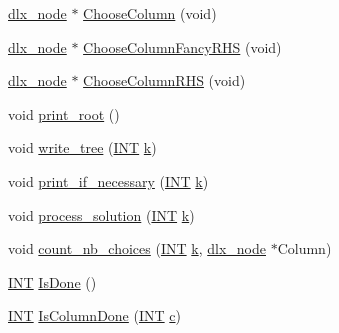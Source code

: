\begin{DoxyCompactItemize}
\item 
\mbox{\hyperlink{structdlx__node}{dlx\+\_\+node}} $\ast$ \mbox{\hyperlink{_l_i_b_2_g_a_l_o_i_s_2dlx_8_c_ab9cb65741895b0cca305fac563917215}{Choose\+Column}} (void)
\item 
\mbox{\hyperlink{structdlx__node}{dlx\+\_\+node}} $\ast$ \mbox{\hyperlink{_l_i_b_2_g_a_l_o_i_s_2dlx_8_c_ae4457eb22022b816e8281ce9c66b177b}{Choose\+Column\+Fancy\+R\+HS}} (void)
\item 
\mbox{\hyperlink{structdlx__node}{dlx\+\_\+node}} $\ast$ \mbox{\hyperlink{_l_i_b_2_g_a_l_o_i_s_2dlx_8_c_af8cfa323dad8209f4cef07a2ef5434a9}{Choose\+Column\+R\+HS}} (void)
\item 
void \mbox{\hyperlink{_l_i_b_2_g_a_l_o_i_s_2dlx_8_c_a2d00a1acd6eba01ef275965881981f59}{print\+\_\+root}} ()
\item 
void \mbox{\hyperlink{_l_i_b_2_g_a_l_o_i_s_2dlx_8_c_ac9de85ee7e49f43b2255f8164510f036}{write\+\_\+tree}} (\mbox{\hyperlink{galois_8h_a09fddde158a3a20bd2dcadb609de11dc}{I\+NT}} \mbox{\hyperlink{simeon_8_c_a43fa990200c3ddd47c35f151bd4d66bf}{k}})
\item 
void \mbox{\hyperlink{_l_i_b_2_g_a_l_o_i_s_2dlx_8_c_aa5b6ab0580fa410716625ff0da94d8c5}{print\+\_\+if\+\_\+necessary}} (\mbox{\hyperlink{galois_8h_a09fddde158a3a20bd2dcadb609de11dc}{I\+NT}} \mbox{\hyperlink{simeon_8_c_a43fa990200c3ddd47c35f151bd4d66bf}{k}})
\item 
void \mbox{\hyperlink{_l_i_b_2_g_a_l_o_i_s_2dlx_8_c_a0644802c7498582c7ecdb3c18be9ac00}{process\+\_\+solution}} (\mbox{\hyperlink{galois_8h_a09fddde158a3a20bd2dcadb609de11dc}{I\+NT}} \mbox{\hyperlink{simeon_8_c_a43fa990200c3ddd47c35f151bd4d66bf}{k}})
\item 
void \mbox{\hyperlink{_l_i_b_2_g_a_l_o_i_s_2dlx_8_c_aea8d3299981a83f8368fca5775cc37f9}{count\+\_\+nb\+\_\+choices}} (\mbox{\hyperlink{galois_8h_a09fddde158a3a20bd2dcadb609de11dc}{I\+NT}} \mbox{\hyperlink{simeon_8_c_a43fa990200c3ddd47c35f151bd4d66bf}{k}}, \mbox{\hyperlink{structdlx__node}{dlx\+\_\+node}} $\ast$Column)
\item 
\mbox{\hyperlink{galois_8h_a09fddde158a3a20bd2dcadb609de11dc}{I\+NT}} \mbox{\hyperlink{_l_i_b_2_g_a_l_o_i_s_2dlx_8_c_a8d89b0913be6ba18a1abdd0c251cbdf2}{Is\+Done}} ()
\item 
\mbox{\hyperlink{galois_8h_a09fddde158a3a20bd2dcadb609de11dc}{I\+NT}} \mbox{\hyperlink{_l_i_b_2_g_a_l_o_i_s_2dlx_8_c_a3007dba2b9acdbd54da58013207771eb}{Is\+Column\+Done}} (\mbox{\hyperlink{galois_8h_a09fddde158a3a20bd2dcadb609de11dc}{I\+NT}} \mbox{\hyperlink{alphabet2_8_c_a4e1e0e72dd773439e333c84dd762a9c3}{c}})

\end{DoxyCompactItemize}
